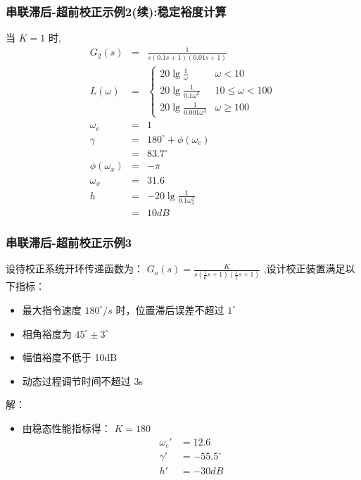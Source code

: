 \documentclass[table]{article}
\begin{document}
\begin{frame}
\frametitle{串联滞后-超前校正示例2(续):稳定裕度计算}
\label{sec-4-2-6}

当  $K=1$  时, 
\begin{eqnarray*}
G_2(s) &=& \frac{1}{s(0.1s+1)(0.01s+1)} \\
L(\omega) & = & \begin{cases} 20\lg\frac{1}{\omega} & \omega<10 \\
                              20\lg\frac{1}{0.1\omega^2} & 10\leq \omega <100 \\
                              20\lg\frac{1}{0.001\omega^3} & \omega\geq 100  \end{cases}\\
\omega_c &=& 1 \\
\gamma &=& 180^{\circ}+\phi(\omega_c) \\
 &=& 83.7^{\circ} \\
\phi(\omega_x) &=& -\pi \\
\omega_x &=& 31.6\\
h &=& -20\lg\frac{1}{0.1\omega_x^2} \\
 &=& 10 dB
\end{eqnarray*}
\end{frame}
\begin{frame}
\frametitle{串联滞后-超前校正示例3}
\label{sec-4-2-7}

设待校正系统开环传递函数为： $G_o(s)=\frac{K}{s(\frac{1}{6}s+1)(\frac{1}{2}s+1)}$ ,设计校正装置满足以下指标：
\begin{itemize}
\item 最大指令速度 $180^{\circ}/s$ 时，位置滞后误差不超过 $1^{\circ}$
\item 相角裕度为 $45^{\circ}\pm 3^{\circ}$
\item 幅值裕度不低于 10dB
\item 动态过程调节时间不超过 3s
\end{itemize}

解：
\begin{itemize}
\item <2-> 由稳态性能指标得：  $K=180$
       \begin{align*}
        \omega_c' &=12.6 \\
        \gamma' &= -55.5^{\circ}\\
        h' &=-30dB
       \end{align*}
\end{itemize}
\end{frame}
\end{document}
